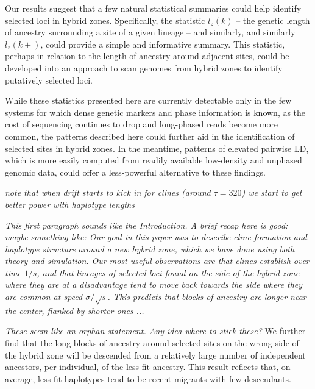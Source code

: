 \documentclass[11pt,letterpaper]{article}
\newcommand{\alisa}[1]{{\em \color{red} #1}}
\newcommand{\plr}[1]{{\em \color{blue} #1}}
\begin{document}
Our results suggest that a few natural statistical summaries could help identify selected loci in hybrid zones. 
Specifically, the statistic $l_z(k)$ -- the genetic length of ancestry surrounding a site of a given lineage -- and similarly,  and similarly $l_z(k\pm)$, could provide a simple and informative summary. 
This statistic, perhaps in relation to the length of ancestry around adjacent sites, could be developed into an approach to scan genomes from hybrid zones to identify putatively selected loci. 

While these statistics presented here are currently detectable only in the few systems for which dense genetic markers and phase information is known, as the cost of sequencing continues to drop and long-phased reads become more common, the patterns described here could further aid in the identification of selected sites in hybrid zones. In the meantime, patterns of elevated pairwise LD, which is more easily computed from readily available low-density and unphased genomic data, could offer a less-powerful alternative to these findings. 


\plr{note that when drift starts to kick in for clines (around $\tau=320$) we start to get better power with haplotype lengths}

\plr{This first paragraph sounds like the Introduction.  A brief recap here is good: maybe something like:
    Our goal in this paper was to describe cline formation and haplotype structure around a new hybrid zone,
    which we have done using both theory and simulation.
    Our most useful observations are that clines establish over time $1/s$,
    and that lineages of selected loci found on the side of the hybrid zone where they are at a disadvantage
    tend to move back towards the side where they are common
    at speed $\sigma/\sqrt{s}$.
    This predicts that blocks of ancestry are longer near the center, flanked by shorter ones ...
}




\alisa{These seem like an orphan statement. Any idea where to stick these?}
We further find that the long blocks of ancestry around selected sites on the wrong side of the hybrid zone will be descended from a relatively large number of independent ancestors, per individual, of the less fit ancestry. This result reflects that, on average, less fit haplotypes tend to be recent migrants with few descendants.  
\end{document}
